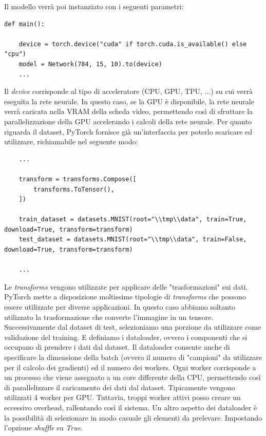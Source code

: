 Il modello verrà poi instanziato con i seguenti parametri:

\begin{lstlisting}
def main():

    device = torch.device("cuda" if torch.cuda.is_available() else "cpu")
    model = Network(784, 15, 10).to(device)
    ...
\end{lstlisting}

Il \textit{device} corrisponde al tipo di acceleratore (CPU, GPU, TPU, ...) 
su cui verrà eseguita la rete neurale.
In questo caso, se la GPU è disponibile, la rete neurale verrà caricata nella 
VRAM della scheda video, permettendo così di sfruttare la parallelizzazione della
GPU accelerando i calcoli della rete neurale. 
\newpage
Per quanto riguarda il dataset, PyTorch fornisce già un'interfaccia per poterlo
scaricare ed utilizzare, richiamabile nel seguente modo:

\begin{lstlisting}
    ...

    transform = transforms.Compose([
        transforms.ToTensor(),
    ])

    train_dataset = datasets.MNIST(root="\\tmp\\data", train=True, download=True, transform=transform)
    test_dataset = datasets.MNIST(root="\\tmp\\data", train=False, download=True, transform=transform)

    ...
\end{lstlisting}

Le \textit{transforms} vengono utilizzate per applicare delle "trasformazioni"
sui dati. PyTorch mette a disposizione moltissime tipologie di \textit{transforms} 
che possono essere utilizzate per diverse applicazioni.
In questo caso abbiamo soltanto utilizzato la trasformazione che converte l'immagine
in un tensore.
Successivamente dal dataset di test, selezioniamo una porzione da utilizzare come 
validazione del training. E definiamo i dataloader, ovvero i componenti che si 
occupano di prendere i dati dal dataset. 
Il dataloader consente anche di specificare la dimensione della batch (ovvero 
il numero di "campioni" da utilizzare per il calcolo dei gradienti) ed il numero 
dei workers. Ogni worker corrisponde a un processo che viene assegnato 
a un core differente della CPU, permettendo così di parallelizzare il caricamento 
dei dati dal dataset. Tipicamente vengono utilizzati 4 worker per GPU. Tuttavia,
troppi worker attivi posso creare un eccessivo overhead, rallentando così il sistema.
Un altro aspetto dei dataloader è la possibilità di selezionare in modo casuale
gli elementi da prelevare. Impostando l'opzione \textit{shuffle} su \textit{True}.

